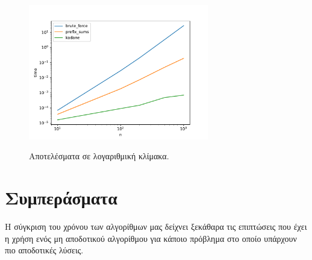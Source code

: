 \documentclass[paper=a4, fontsize=11pt]{scrartcl}
\numberwithin{equation}{section}		%
\numberwithin{figure}{section}			%
\numberwithin{table}{section}				%
\begin{document}
\begin{figure}[h]
    \caption{Αποτελέσματα σε λογαριθμική κλίμακα.}
    \centering
    \includegraphics[width=0.7\textwidth]{algorithms_comparisson.pdf}
    \label{fig:results_log}
\end{figure}

\section{Συμπεράσματα}
Η σύγκριση του χρόνου των αλγορίθμων μας δείχνει ξεκάθαρα τις επιπτώσεις που έχει η χρήση ενός μη αποδοτικού αλγορίθμου για κάποιο πρόβλημα στο οποίο υπάρχουν πιο αποδοτικές λύσεις.

\end{document}
